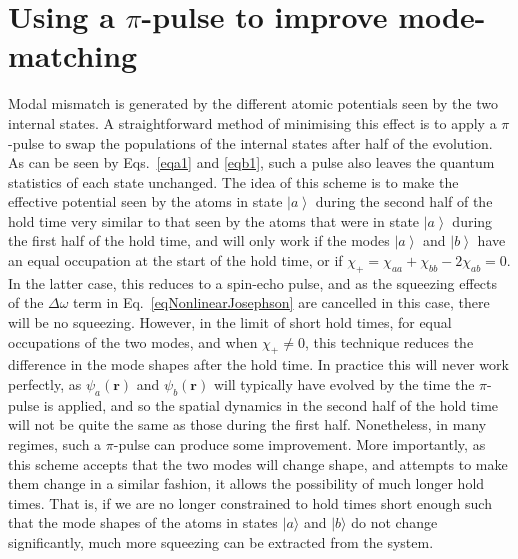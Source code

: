 \documentclass{iopart}
\newcommand{\ket}[1]{\ensuremath{\left|#1\right>}}
\begin{document}
\section{Using a $\pi$-pulse to improve mode-matching} \label{sec:pipulse}

Modal mismatch is generated by the different atomic potentials seen by the two internal states.  A straightforward method of minimising this effect is to apply a $\pi$-pulse to swap the populations of the internal states after half of the evolution.  As can be seen by Eqs.~\eqref{eqa1} and \eqref{eqb1}, such a pulse also leaves the quantum statistics of each state unchanged.  The idea of this scheme is to make the effective potential seen by the atoms in state $\ket{a}$ during the second half of the hold time very similar to that seen by the atoms that were in state $\ket{a}$ during the first half of the hold time, and will only work if the modes $\ket{a}$ and $\ket{b}$ have an equal occupation at the start of the hold time, or if $\chi_+=\chi_{aa} + \chi_{bb} - 2\chi_{ab}=0$.  In the latter case, this reduces to a spin-echo pulse, and as the squeezing effects of the $\Delta\omega$ term in Eq.~\eqref{eqNonlinearJosephson} are cancelled in this case, there will be no squeezing.  However, in the limit of short hold times, for equal occupations of the two modes, and when $\chi_+\neq 0$, this technique reduces the difference in the mode shapes after the hold time.  In practice this will never work perfectly, as $\psi_a(\mathbf{r})$ and $\psi_b(\mathbf{r})$ will typically have evolved by the time the $\pi$-pulse is applied, and so the spatial dynamics in the second half of the hold time will not be quite the same as those during the first half.  Nonetheless, in many regimes, such a $\pi$-pulse can produce some improvement.  More importantly, as this scheme accepts that the two modes will change shape, and attempts to make them change in a similar fashion, it allows the possibility of much longer hold times. That is, if we are no longer constrained to hold times short enough such that the mode shapes of the atoms in states $|a \rangle$ and $|b \rangle$ do not change significantly, much more squeezing can be extracted from the system.
\end{document}
